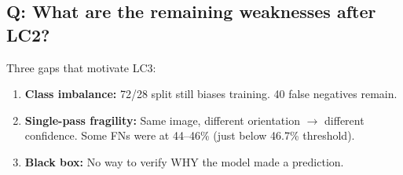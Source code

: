 \documentclass[11pt]{article}
\begin{document}
\subsection{Q: What are the remaining weaknesses after LC2?}

Three gaps that motivate LC3:
\begin{enumerate}[noitemsep]
    \item \textbf{Class imbalance:} 72/28 split still biases training. 40 false negatives remain.
    \item \textbf{Single-pass fragility:} Same image, different orientation $\to$ different confidence. Some FNs were at 44--46\% (just below 46.7\% threshold).
    \item \textbf{Black box:} No way to verify WHY the model made a prediction.
\end{enumerate}
\end{document}
